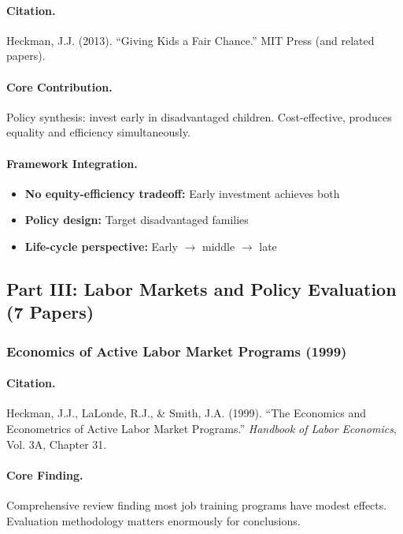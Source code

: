 \documentclass[12pt,a4paper]{article}
\begin{document}
\paragraph{Citation.}
Heckman, J.J. (2013). ``Giving Kids a Fair Chance.''
MIT Press (and related papers).

\paragraph{Core Contribution.}
Policy synthesis: invest early in disadvantaged children.
Cost-effective, produces equality and efficiency simultaneously.

\paragraph{Framework Integration.}
\begin{itemize}
  \item \textbf{No equity-efficiency tradeoff:} Early investment achieves both
  \item \textbf{Policy design:} Target disadvantaged families
  \item \textbf{Life-cycle perspective:} Early $\to$ middle $\to$ late
\end{itemize}

\subsection{Part III: Labor Markets and Policy Evaluation (7 Papers)}

\subsubsection{Economics of Active Labor Market Programs (1999)}

\paragraph{Citation.}
Heckman, J.J., LaLonde, R.J., \& Smith, J.A. (1999).
``The Economics and Econometrics of Active Labor Market Programs.''
\emph{Handbook of Labor Economics}, Vol. 3A, Chapter 31.

\paragraph{Core Finding.}
Comprehensive review finding most job training programs have modest effects.
Evaluation methodology matters enormously for conclusions.
\end{document}
